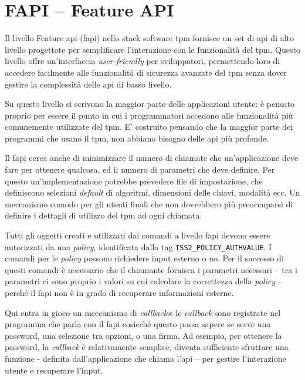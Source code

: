 \section{FAPI -- Feature API}\label{sec:fapi}

Il livello Feature \acrshort{api} (\acrshort{fapi}) nello stack software \acrshort{tpm} fornisce un set di \acrshort{api} di alto livello progettate per semplificare l'interazione con le funzionalità del \acrshort{tpm}. Questo livello offre un'interfaccia \textit{user-friendly} per sviluppatori, permettendo loro di accedere facilmente alle funzionalità di sicurezza avanzate del \acrshort{tpm} senza dover gestire la complessità delle \acrshort{api} di basso livello.

Su questo livello si scrivono la maggior parte delle applicazioni utente: è pensato proprio per essere il punto in cui i programmatori accedono alle funzionalità più comunemente utilizzate del \acrshort{tpm}. E' costruito pensando che la maggior parte dei programmi che usano il \acrshort{tpm}, non abbiano bisogno delle \acrshort{api} più profonde.

Il \acrshort{fapi} cerca anche di minimizzare il numero di chiamate che un'applicazione deve fare per ottenere qualcosa, ed il numero di parametri che deve definire. Per questo un'implementazione potrebbe prevedere file di impostazione, che definiscono selezioni \textit{default} di algoritmi, dimensioni delle chiavi, modalità ecc. Un meccanismo comodo per gli utenti finali che non dovrebbero più preoccuparsi di definire i dettagli di utilizzo del \acrshort{tpm} ad ogni chiamata.

Tutti gli oggetti creati e utilizzati dai comandi a livello \acrshort{fapi} devono essere autorizzati da una \textit{policy}, identificata dalla tag \texttt{TSS2\_POLICY\_AUTHVALUE}. I comandi per le \textit{policy} possono richiedere input esterno o no. Per il successo di questi comandi è necessario che il chiamante fornisca i parametri necessari -- tra i parametri ci sono proprio i valori su cui calcolare la correttezza della \textit{policy} -- perché il \acrshort{fapi} non è in grado di recuperare informazioni esterne.

Qui entra in gioco un meccanismo di \textit{callbacks}: le \textit{callback} sono registrate nel programma che parla con il \acrshort{fapi} cosicché questo possa sapere se serve una password, una selezione tra opzioni, o una firma. Ad esempio, per ottenere la password, la \textit{callback} è relativamente semplice, diventa sufficiente sfruttare una funzione - definita dall'applicazione che chiama l'\acrshort{api} -- per gestire l'interazione utente e recuperare l'input. 

